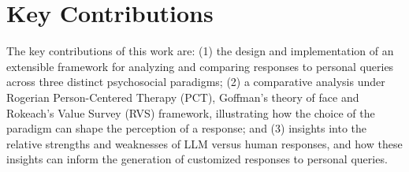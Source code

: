 \section{Key Contributions}
The key contributions of this work are: (1) the design and implementation of an extensible framework for analyzing and comparing responses to personal queries across three distinct psychosocial paradigms; (2) a comparative analysis under Rogerian Person-Centered Therapy (PCT), Goffman’s theory of face and Rokeach’s Value Survey (RVS) framework, illustrating how the choice of the paradigm can shape the perception of a response; and (3) insights into the relative strengths and weaknesses of LLM versus human responses, and how these insights can inform the generation of customized responses to personal queries.

